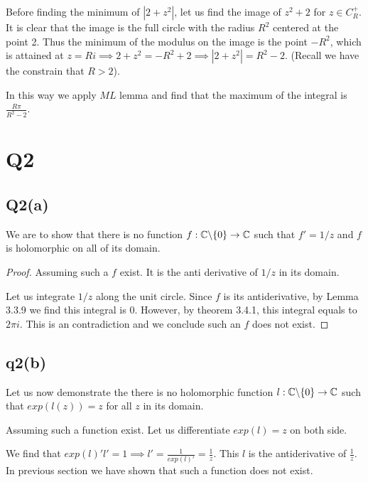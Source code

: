 \documentclass[12pt, a4paper]{article}
\theoremstyle{definition}
\theoremstyle{remark}
\newcommand{\bb}[1]{\mathbb{#1}}
\begin{document}
Before finding the minimum of $|2+z^2|$, let us find the image of $z^2 + 2$ for $z \in C^+_{R}$. 
It is clear that the image is the full circle with the radius $R^2$ centered at the point 2.
Thus the minimum of the modulus on the image is the point $-R^2$, which is attained at $z = Ri \implies 2+z^2 = -R^2 +2 \implies |2+z^2| = R^2 - 2 $. 
(Recall we have the constrain that $R > 2$).

In this way we apply $ML$ lemma and find that the maximum of the integral is $\frac{R\pi}{R^2 - 2}$.

\section{Q2} %
\label{sec:Q2}

\subsection{Q2(a)}
\label{subsec:Q2(a)}

We are to show that there is no function $f: \bb{C} \symbol{92} \{0 \} \rightarrow \bb{C}$ such that $f' = 1/z$ and $f$ is holomorphic on all of its domain.

\begin{proof}
  Assuming such a $f$ exist. It is the anti derivative of $1/z$ in its domain. 

  Let us integrate $1/z$ along the unit circle. Since $f$ is its antiderivative, by Lemma 3.3.9 we find this integral is 0. However, by theorem 3.4.1, this integral equals to $2\pi i$. This is an contradiction and we conclude such an $f$ does not exist.
\end{proof}

\subsection{q2(b)}
\label{subsec:q2(b)}

Let us now demonstrate the there is no holomorphic function $l: \bb{C} \symbol{92} \{0\} \rightarrow \bb{C}$ such that $exp(l(z)) =z$ for all $z
$ in its domain.

Assuming such a function exist. Let us differentiate $exp(l) = z$ on both side. 

We find that $exp(l)' l' = 1 \implies l' = \frac{1}{exp(l)'} = \frac{1}{z}$. This $l$ is the antiderivative of $\frac{1}{z}$. In previous section we have shown that such a function does not exist.

\end{document}
